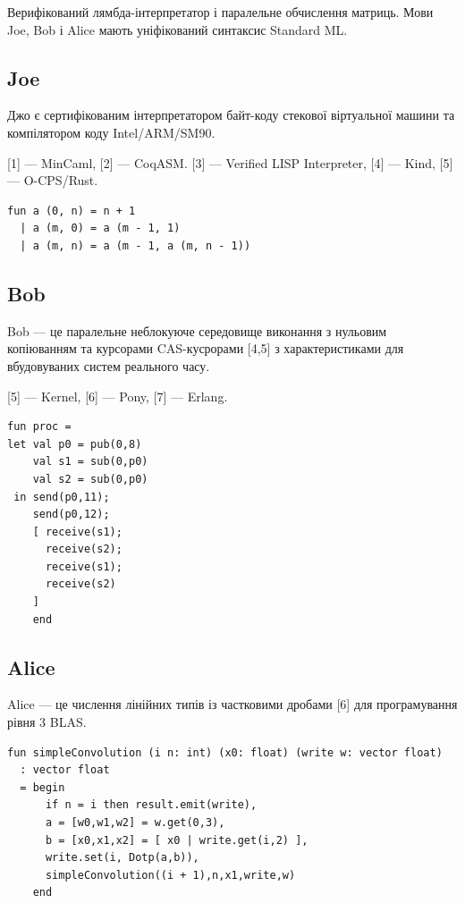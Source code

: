 Верифікований лямбда-інтерпретатор і паралельне обчислення матриць. Мови Joe,
Bob і Alice мають уніфікований синтаксис Standard ML.

\subsection*{Joe}

Джо є сертифікованим інтерпретатором байт-коду стекової віртуальної машини
та компілятором коду Intel/ARM/SM90.

[1] — MinCaml, [2] — CoqASM. [3] — Verified LISP Interpreter, [4] — Kind, [5] — O-CPS/Rust.

\begin{lstlisting}
fun a (0, n) = n + 1
  | a (m, 0) = a (m - 1, 1)
  | a (m, n) = a (m - 1, a (m, n - 1))
\end{lstlisting}

\subsection*{Bob}

Bob — це паралельне неблокуюче середовище виконання з нульовим копіюванням
та курсорами CAS-кусрорами [4,5] з характеристиками для вбудовуваних систем
реального часу.

[5] — Kernel, [6] — Pony, [7] — Erlang.

\begin{lstlisting}
fun proc =
let val p0 = pub(0,8)
    val s1 = sub(0,p0)
    val s2 = sub(0,p0)
 in send(p0,11);
    send(p0,12);
    [ receive(s1);
      receive(s2);
      receive(s1);
      receive(s2)
    ]
    end
\end{lstlisting}

\subsection*{Alice}

Alice — це числення лінійних типів із частковими дробами [6] для програмування рівня 3 BLAS.

\begin{lstlisting}
fun simpleConvolution (i n: int) (x0: float) (write w: vector float)
  : vector float
  = begin
      if n = i then result.emit(write),
      a = [w0,w1,w2] = w.get(0,3),
      b = [x0,x1,x2] = [ x0 | write.get(i,2) ],
      write.set(i, Dotp(a,b)),
      simpleConvolution((i + 1),n,x1,write,w)
    end
\end{lstlisting}

